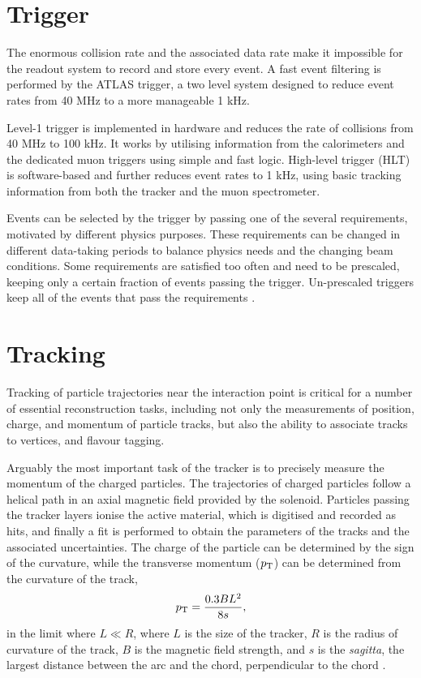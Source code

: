 \section{Trigger}

The enormous collision rate and the associated data rate make it
impossible for the readout system to record and store every event. A fast
event filtering is performed by the ATLAS trigger, a two level system
designed to reduce event rates from 40 MHz to a more manageable 1 kHz.

Level-1 trigger is implemented in hardware and reduces the rate of
collisions from 40 MHz to 100 kHz. It works by utilising information
from the calorimeters and the dedicated muon triggers using simple
and fast logic. High-level trigger (HLT) is software-based and further
reduces event rates to 1 kHz, using basic tracking information from both
the tracker and the muon spectrometer.

Events can be selected by the trigger by passing one of the several
requirements, motivated by different physics purposes. These requirements
can be changed in different data-taking periods to balance physics needs
and the changing beam conditions. Some requirements are satisfied too
often and need to be prescaled, keeping only a certain fraction of events
passing the trigger. Un-prescaled triggers keep all of the events that
pass the requirements \cite{Aaboud:2016leb}.

\section{Tracking}

Tracking of particle trajectories near the interaction point is critical
for a number of essential reconstruction tasks, including not only
the measurements of position, charge, and momentum of particle tracks, but also
the ability to associate tracks to vertices, and flavour tagging.

Arguably the most important task of the tracker is to precisely measure
the momentum of the charged particles. The trajectories of charged
particles follow a helical path in an axial magnetic field provided
by the solenoid. Particles passing the tracker layers ionise the active material,
which is digitised and recorded as hits, and finally a fit is performed
to obtain the parameters of the tracks and the associated uncertainties.
The charge of the particle can be determined by the 
sign of the curvature, while the transverse momentum ($p_{\text{T}}$) can be
determined from the curvature of the track,
\begin{equation}
p_{\text{T}} = \frac{0.3 B L^2}{8s},
\end{equation}
in the limit where $L \ll R$, where $L$ is the size of the tracker,
$R$ is the radius of curvature of the track, $B$ is the magnetic field
strength, and $s$ is the \textit{sagitta}, the largest distance between
the arc and the chord, perpendicular to the chord \cite{Ragusa:2007zz}.

